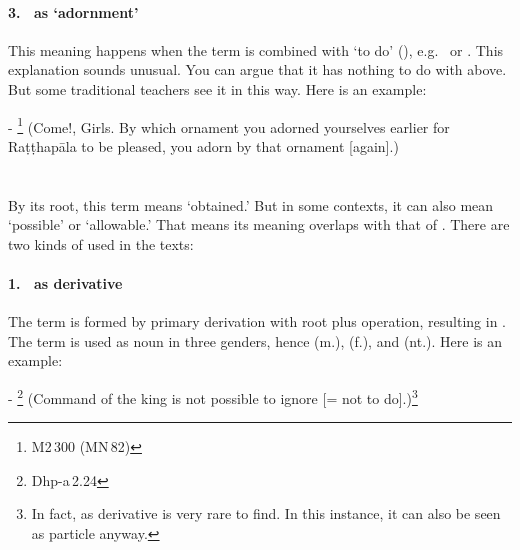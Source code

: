 \paragraph*{3.\  as `adornment'} This meaning happens when the term is combined with `to do' (), e.g.\  or . This explanation sounds unusual. You can argue that it has nothing to do with  above. But some traditional teachers see it in this way. Here is an example:\par
- \footnote{M2\,300 (MN\,82)} (Come!, Girls. By which ornament you adorned yourselves earlier for Ra\d t\d thap\=ala to be pleased, you adorn by that ornament [again].)\par

\section*{}

By its root, this term means `obtained.' But in some contexts, it can also mean `possible' or `allowable.' That means its meaning overlaps with that of . There are two kinds of  used in the texts:

\paragraph*{1.\  as derivative} The term is formed by primary derivation with root  plus  operation, resulting in . The term is used as noun in three genders, hence  (m.),  (f.), and  (nt.). Here is an example:\par
- \footnote{Dhp-a\,2.24} (Command of the king is not possible to ignore [= not to do].)\footnote{In fact,  as derivative is very rare to find. In this instance, it can also be seen as particle anyway.}\par


